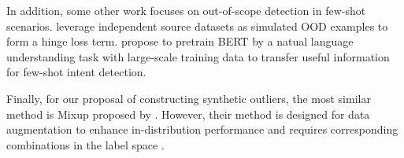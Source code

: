 In addition, some other work focuses on out-of-scope detection in few-shot scenarios. \citet{tan-etal-2019-domain} leverage independent source datasets as simulated OOD examples to form a hinge loss term. \citet{zhang-etal-2020-discriminative} propose to pretrain BERT by a natual language understanding task with large-scale training data to transfer useful information for few-shot intent detection. 

Finally, for our proposal of constructing synthetic outliers, the most similar method is {Mixup} proposed by \citet{DBLP:conf/iclr/ZhangCDL18}. However, their method is designed for data augmentation to enhance in-distribution performance and requires corresponding combinations in the label space \cite{DBLP:conf/nips/ThulasidasanCBB19}.











